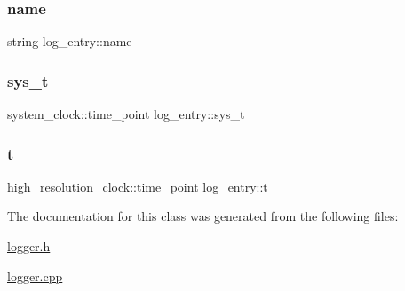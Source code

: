 \mbox{\label{classlog__entry_ac65943b778a5978a579d984a6b682def}} 
\subsubsection{\texorpdfstring{name}{name}}
{\footnotesize\ttfamily string log\+\_\+entry\+::name}

\mbox{\label{classlog__entry_a2877798c71ba0f0762b821633c8bc517}} 
\subsubsection{\texorpdfstring{sys\+\_\+t}{sys\_t}}
{\footnotesize\ttfamily system\+\_\+clock\+::time\+\_\+point log\+\_\+entry\+::sys\+\_\+t}

\mbox{\label{classlog__entry_a9477b6872dfa3609db1e4e6a97ed5dba}} 
\subsubsection{\texorpdfstring{t}{t}}
{\footnotesize\ttfamily high\+\_\+resolution\+\_\+clock\+::time\+\_\+point log\+\_\+entry\+::t}



The documentation for this class was generated from the following files\+:\begin{DoxyCompactItemize}
\item 
\hyperlink{logger_8h}{logger.\+h}\item 
\hyperlink{logger_8cpp}{logger.\+cpp}\end{DoxyCompactItemize}

